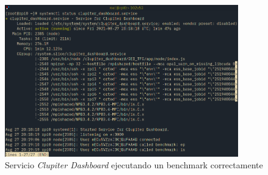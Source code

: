 \begin{figure}[h!]
  \centering
  \vspace*{0.5cm}
  \includegraphics[width=0.9\textwidth]{img/systemd_clupiter_dashboard.png}
  \caption{Servicio \textit{Clupiter Dashboard} ejecutando un benchmark correctamente}
  \label{fig:systemd_clupiter_dashboard}
\end{figure}

